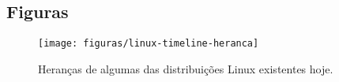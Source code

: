 \begin{anexosenv}

\partanexos


\chapter{\nmu Figuras}\label{long_figures}


\begin{figure}[h]
  \centering
	\texttt{[image: figuras/linux-timeline-heranca]}
  \caption{Heranças de algumas das distribuições Linux existentes hoje\protect\footnotemark.}
  \label{fig:figuras_linux_timeline_heranca}
\end{figure}


\end{anexosenv}

